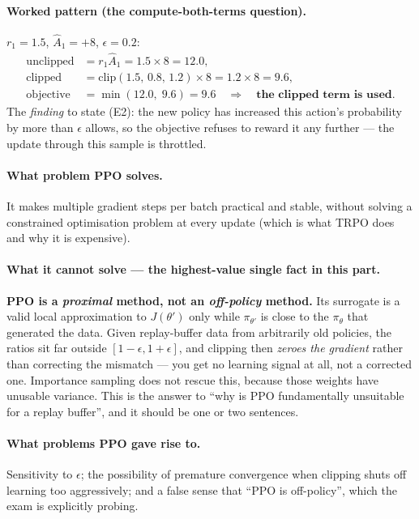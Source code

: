 \documentclass[11pt,a4paper]{article}
\begin{document}
\paragraph{Worked pattern (the compute-both-terms question).}
$r_1=1.5$, $\hat A_1=+8$, $\epsilon=0.2$:
\begin{align*}
\text{unclipped} &= r_1\hat A_1 = 1.5\times 8 = 12.0,\\
\text{clipped} &= \mathrm{clip}(1.5,\,0.8,\,1.2)\times 8 = 1.2\times 8 = 9.6,\\
\text{objective} &= \min(12.0,\;9.6) = 9.6 \quad\Rightarrow\quad \textbf{the clipped term is used.}
\end{align*}
The \emph{finding} to state (E2): the new policy has increased this action's
probability by more than $\epsilon$ allows, so the objective refuses to reward
it any further --- the update through this sample is throttled.

\paragraph{What problem PPO solves.} It makes multiple gradient steps per
batch practical and stable, without solving a constrained optimisation
problem at every update (which is what TRPO does and why it is expensive).

\paragraph{What it cannot solve --- the highest-value single fact in this part.}
\textbf{PPO is a \emph{proximal} method, not an \emph{off-policy} method.}
Its surrogate is a valid local approximation to $J(\theta')$ only while
$\pi_{\theta'}$ is close to the $\pi_\theta$ that generated the data.
Given replay-buffer data from arbitrarily old policies, the ratios sit far
outside $[1-\epsilon,1+\epsilon]$, and clipping then \emph{zeroes the
gradient} rather than correcting the mismatch --- you get no learning signal
at all, not a corrected one. Importance sampling does not rescue this,
because those weights have unusable variance. This is the answer to ``why is
PPO fundamentally unsuitable for a replay buffer'', and it should be one or
two sentences.

\paragraph{What problems PPO gave rise to.} Sensitivity to $\epsilon$; the
possibility of premature convergence when clipping shuts off learning too
aggressively; and a false sense that ``PPO is off-policy'', which the exam is
explicitly probing.
\end{document}
